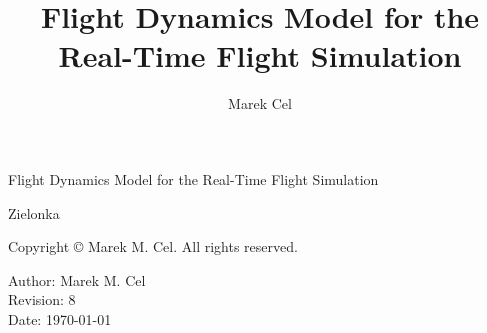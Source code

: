 \documentclass[12pt,a4paper]{report}
\title{Flight Dynamics Model for the Real-Time Flight Simulation}
\author{Marek Cel}
\date{}
\begin{document}
  
  \begin{titlepage}
    \setlength{\parskip}{0em}
    \centering
    {\huge Flight Dynamics Model for the Real-Time Flight Simulation\par}
    \vfill
    {\large Zielonka}
    {\par \large \the\year}
  \end{titlepage}

  \noindent Copyright \copyright{} \the\year{} Marek M. Cel. All rights reserved.

  \noindent Author: Marek M. Cel \\
  Revision: 8 \\
  Date: \today

  
  
  {
    \clearpage
    \setlength{\parskip}{0em}
    \tableofcontents
  }

  
  
  
  
  \clearpage
   
  
  
\end{document}
